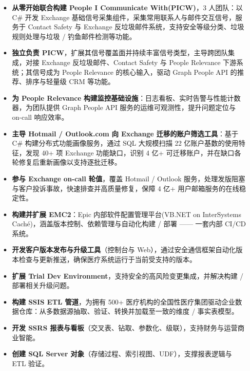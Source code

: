 \documentclass{resume_cn-v2}
\begin{document}
\begin{itemize}
  \item \textbf{从零开始联合构建 People I Communicate With(PICW)}，3 人团队：以 C\# 开发 Exchange 基础信号采集组件，采集常用联系人与邮件交互信号，服务于 Contact Safety 与 Exchange 反垃圾邮件系统，支持安全等级分类、垃圾规则处理与垃圾 / 钓鱼邮件检测等功能。
  \item \textbf{独立负责 PICW}，扩展其信号覆盖面并持续丰富信号类型，主导跨团队集成，对接 Exchange 反垃圾邮件、Contact Safety 与 People Relevance 下游系统；其信号成为 People Relevance 的核心输入，驱动 Graph People API 的推荐、排序与轻量级 CRM 等功能。
  \item \textbf{为 People Relevance 构建监控基础设施}：日志看板、实时告警与性能计数器，为团队提供 Graph People API 服务的运维可观测性，提升问题定位与 on-call 响应效率。
  \item \textbf{主导 Hotmail / Outlook.com 向 Exchange 迁移的账户筛选工具}：基于 C\# 构建分布式功能画像服务，通过 SQL 大规模扫描 22 亿账户基数的使用特征，发现 40+ 项 Exchange 功能缺口，识别 4 亿+ 可迁移账户，并在缺口各轮修复后重新画像以支持逐批迁移。
  \item \textbf{参与 Exchange on-call 轮值}，覆盖 Hotmail / Outlook 服务，处理发版阻塞与客户投诉事故，快速排查并高质量修复，保障 4 亿+ 用户邮箱服务的在线稳定性。
\end{itemize}

\begin{itemize}
  \item \textbf{构建并扩展 EMC2}：Epic 内部软件配置管理平台(VB.NET on InterSystems Caché)，涵盖版本控制、依赖管理与自动化构建 / 部署 —— 一套内部 CI/CD 系统。
  \item \textbf{开发客户版本发布与升级工具}（控制台与 Web），通过安全通信框架自动化版本检查与更新推送，确保医疗系统运行于当前受支持的版本。
  \item \textbf{扩展 Trial Dev Environment}，支持安全的高风险变更集成，并解决构建 / 部署相关升级问题。
\end{itemize}

\begin{itemize}
  \item \textbf{构建 SSIS ETL 管道}，为拥有 500+ 医疗机构的全国性医疗集团驱动企业数据仓库：从多数据源抽取、验证、转换并加载至一致的维度 / 事实表模型。
  \item \textbf{开发 SSRS 报表与看板}（交叉表、钻取、参数化、级联），支持财务与运营商业智能。
  \item \textbf{创建 SQL Server 对象}（存储过程、索引视图、UDF），支撑报表逻辑与 ETL 验证。
\end{itemize}

\end{document}
